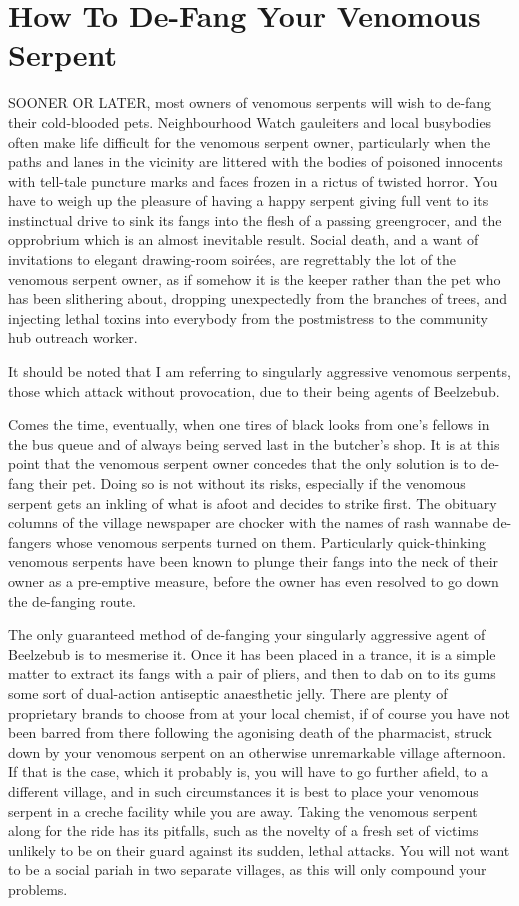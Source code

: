 \chapter{How To De-Fang Your Venomous Serpent}

SOONER OR LATER, most owners of venomous serpents will wish to de-fang their cold-blooded pets. Neighbourhood Watch gauleiters and local busybodies often make life difficult for the venomous serpent owner, particularly when the paths and lanes in the vicinity are littered with the bodies of poisoned innocents with tell-tale puncture marks and faces frozen in a rictus of twisted horror. You have to weigh up the pleasure of having a happy serpent giving full vent to its instinctual drive to sink its fangs into the flesh of a passing greengrocer, and the opprobrium which is an almost inevitable result. Social death, and a want of invitations to elegant drawing-room soir\'{e}es, are regrettably the lot of the venomous serpent owner, as if somehow it is the keeper rather than the pet who has been slithering about, dropping unexpectedly from the branches of trees, and injecting lethal toxins into everybody from the postmistress to the community hub outreach worker.

It should be noted that I am referring to singularly aggressive venomous serpents, those which attack without provocation, due to their being agents of Beelzebub.

Comes the time, eventually, when one tires of black looks from one's fellows in the bus queue and of always being served last in the butcher's shop. It is at this point that the venomous serpent owner concedes that the only solution is to de-fang their pet. Doing so is not without its risks, especially if the venomous serpent gets an inkling of what is afoot and decides to strike first. The obituary columns of the village newspaper are chocker with the names of rash wannabe de-fangers whose venomous serpents turned on them. Particularly quick-thinking venomous serpents have been known to plunge their fangs into the neck of their owner as a pre-emptive measure, before the owner has even resolved to go down the de-fanging route.

The only guaranteed method of de-fanging your singularly aggressive agent of Beelzebub is to mesmerise it. Once it has been placed in a trance, it is a simple matter to extract its fangs with a pair of pliers, and then to dab on to its gums some sort of dual-action antiseptic anaesthetic jelly. There are plenty of proprietary brands to choose from at your local chemist, if of course you have not been barred from there following the agonising death of the pharmacist, struck down by your venomous serpent on an otherwise unremarkable village afternoon. If that is the case, which it probably is, you will have to go further afield, to a different village, and in such circumstances it is best to place your venomous serpent in a creche facility while you are away. Taking the venomous serpent along for the ride has its pitfalls, such as the novelty of a fresh set of victims unlikely to be on their guard against its sudden, lethal attacks. You will not want to be a social pariah in two separate villages, as this will only compound your problems.

